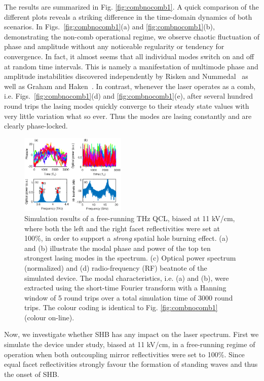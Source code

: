 \documentclass[journal]{IEEEtran}
\begin{document}
	The results are summarized in Fig. \ref{fig:combnocomb1}. A quick comparison of the different plots reveals a striking difference in the time-domain dynamics of both scenarios. In Figs.~\ref{fig:combnocomb1}(a) and \ref{fig:combnocomb1}(b), demonstrating the non-comb operational regime, we observe chaotic fluctuation of phase and amplitude without any noticeable regularity or tendency for convergence. In fact, it almost seems that all individual modes switch on and off at random time intervals. This is namely a manifestation of multimode phase and amplitude instabilities discovered independently by Risken and Nummedal~\cite{risken1968self} as well as Graham and Haken~\cite{graham1968quantum}. In contrast, whenever the laser operates as a comb, i.e. Figs.~\ref{fig:combnocomb1}(d) and \ref{fig:combnocomb1}(e), after several hundred round trips the lasing modes quickly converge to their steady state values with very little variation what so ever. Thus the modes are lasing constantly and are clearly phase-locked. 
	
	\begin{figure}[h!]
		\centering
		\includegraphics[width=0.45\textwidth]{IMGS/NOCOMB_NODISP}
		\caption{Simulation results of a free-running THz QCL, biased at 11 kV/cm, where both the left and the right facet reflectivities were set at 100\%, in order to support a \emph{strong} spatial hole burning effect. (a) and (b) illustrate the modal phase and power of the top ten strongest lasing modes in the spectrum. (c) Optical power spectrum (normalized) and (d) radio-frequency (RF) beatnote of the simulated device. The modal characteristics, i.e. (a) and (b), were extracted using the short-time Fourier transform with a Hanning window of 5 round trips over a total simulation time of 3000 round trips. The colour coding is identical to Fig. \ref{fig:combnocomb1} (colour on-line).}	\label{fig:NOCOMB_NODISP}
	\end{figure}
	
	Now, we investigate whether SHB has any impact on the laser spectrum. First we simulate the device under study, biased at 11 kV/cm, in a free-running regime of operation when both outcoupling mirror reflectivities were set to 100\%. Since equal facet reflectivities strongly favour the formation of standing waves and thus the onset of SHB. 
	
\end{document}
